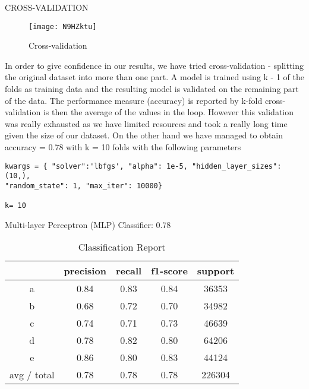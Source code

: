 \documentclass[journal]{IEEEtran}
\begin{document}
CROSS-VALIDATION

\begin{figure}[ht]
\centering
\texttt{[image: N9HZktu]}
\caption{Cross-validation}
\label{fig:crossvalidation}
\end{figure}

In order to give confidence in our results, we have tried cross-validation - splitting the original dataset into more than one part. A model is trained using k - 1 of the folds as training data and the resulting model is validated on the remaining part of the data. The performance measure (accuracy) is reported by k-fold cross-validation is then the average of the values in the loop. However this validation was really exhausted as we have limited resources and took a really long time given the size of our dataset. On the other hand we have managed to obtain accuracy = 0.78 with k = 10 folds with the following parameters

\begin{lstlisting}
kwargs = { "solver":'lbfgs', "alpha": 1e-5, "hidden_layer_sizes": (10,),
"random_state": 1, "max_iter": 10000}

k= 10
\end{lstlisting}

Multi-layer Perceptron (MLP) Classifier: 0.78


\begin{table}[ht]
\caption{Classification Report}
\label{Classification Report}
\centering
\begin{tabular}{|c||c|c|c|c|}
\hline
& precision & recall & f1-score & support \\
\hline
a & 0.84 & 0.83 & 0.84 & 36353 \\ 
\hline
b & 0.68 & 0.72 & 0.70 & 34982 \\
\hline
c & 0.74 & 0.71 & 0.73 & 46639 \\ 
\hline
d & 0.78 & 0.82 & 0.80 & 64206 \\ 
\hline
e & 0.86 & 0.80 & 0.83 & 44124 \\ 
\hline
avg / total & 0.78 & 0.78 & 0.78 & 226304 \\
\hline
\end{tabular}
\end{table}
\end{document}
